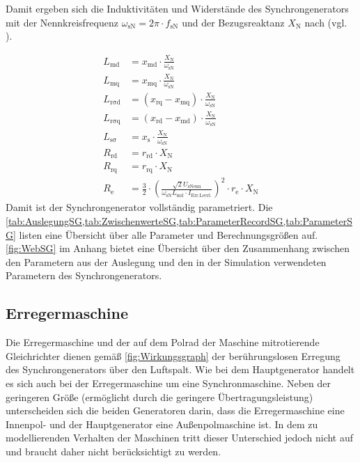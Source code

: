 Damit ergeben sich die Induktivitäten und Widerstände des Synchrongenerators mit der Nennkreisfrequenz \(\omega_{\mathrm{sN}}=2\pi\cdot f_{\mathrm{sN}}\) und der Bezugsreaktanz \(X_{\mathrm{N}}\) nach  (vgl. \cite[S.265f.]{kralModelicaObjektorientierteModellbildung2019}).

\begin{align}
	L_{\mathrm{md}} &= x_{\mathrm{md}}\cdot \frac{X_{\mathrm{N}}}{\omega_{\mathrm{sN}}} \label{eq:LmgSG}\\
	L_{\mathrm{mq}} &= x_{\mathrm{mq}}\cdot \frac{X_{\mathrm{N}}}{\omega_{\mathrm{sN}}} \\
	L_{\mathrm{r \sigma d}} &= (x_{\mathrm{rq}}-x_{\mathrm{mq}})\cdot \frac{X_{\mathrm{N}}}{\omega_{\mathrm{sN}}} \\
	L_{\mathrm{r \sigma q}} &= (x_{\mathrm{rd}}-x_{\mathrm{md}})\cdot \frac{X_{\mathrm{N}}}{\omega_{\mathrm{sN}}} \\
	L_{\mathrm{s \sigma}} &= x_{\mathrm{s}}\cdot \frac{X_{\mathrm{N}}}{\omega_{\mathrm{sN}}} \\
	R_{\mathrm{rd}} &= r_{\mathrm{rd}}\cdot X_{\mathrm{N}} \\
	R_{\mathrm{rq}} &= r_{\mathrm{rq}}\cdot X_{\mathrm{N}} \\
	R_{\mathrm{e}} &= \frac{3}{2}\cdot \left(\frac{\sqrt{2}U_{\mathrm{sNenn}}}{\omega_{\mathrm{sN}}L_{\mathrm{md}}\cdot I_{\mathrm{Err. Leerl.}}}\right)^2\cdot r_{\mathrm{e}}\cdot X_{\mathrm{N}}\label{eq:ReSG}
\end{align}
Damit ist der Synchrongenerator vollständig parametriert. Die \cref{tab:AuslegungSG,tab:ZwischenwerteSG,tab:ParameterRecordSG,tab:ParameterSG} listen eine Übersicht über alle Parameter und Berechnungsgrößen auf. \cref{fig:WebSG} im Anhang bietet eine Übersicht über den Zusammenhang zwischen den Parametern aus der Auslegung und den in der Simulation verwendeten Parametern des Synchrongenerators.

\subsection{Erregermaschine}\label{sec:erregermaschine}

Die Erregermaschine und der auf dem Polrad der Maschine mitrotierende Gleichrichter dienen gemäß \cref{fig:Wirkungsgraph} der berührungslosen Erregung des Synchrongenerators über den Luftspalt. Wie bei dem Hauptgenerator handelt es sich auch bei der Erregermaschine um eine Synchronmaschine. Neben der geringeren Größe (ermöglicht durch die geringere Übertragungsleistung) unterscheiden sich die beiden Generatoren darin, dass die Erregermaschine eine Innenpol- und der Hauptgenerator eine Außenpolmaschine ist. In dem zu modellierenden Verhalten der Maschinen tritt dieser Unterschied jedoch nicht auf und braucht daher nicht berücksichtigt zu werden.

